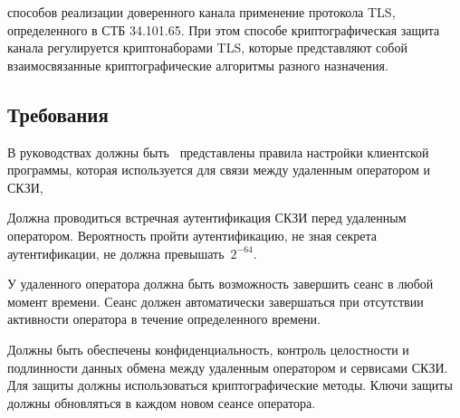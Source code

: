  способов реализации доверенного канала 
 применение протокола TLS, определенного в СТБ 
34.101.65. При этом способе криптографическая защита канала регулируется 
криптонаборами TLS, которые представляют собой взаимосвязанные 
криптографические алгоритмы разного назначения.



\subsection{Требования}\label{TC.Reqs}

\label{R.TC.GD}
В руководствах должны быть~
представлены правила настройки клиентской программы, которая используется для  
связи между удаленным оператором и СКЗИ, 

\label{R.TC.Client}

\label{R.TC.Auth}

\label{R.TC.Auth2}
Должна проводиться встречная аутентификация СКЗИ перед удаленным оператором.
Вероятность пройти аутентификацию, не зная секрета аутентификации, 
не должна превышать~$2^{-64}$.

\label{R.TC.Logout}
У удаленного оператора должна быть возможность завершить сеанс в любой момент 
времени. Сеанс должен автоматически завершаться при отсутствии активности 
оператора в течение определенного времени.

\label{R.TC.Crypto}
Должны быть обеспечены конфиденциальность, контроль целостности и подлинности 
данных обмена между удаленным оператором и сервисами СКЗИ.
%
Для защиты должны использоваться криптографические методы.
%
Ключи защиты должны обновляться в каждом новом сеансе оператора.

